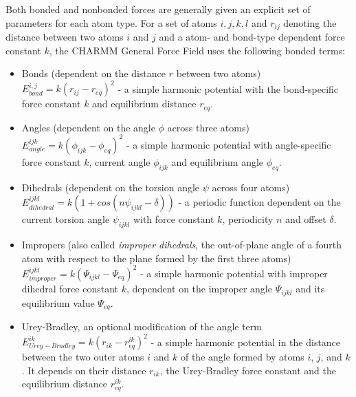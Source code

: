 \documentclass[oneside]{scrreprt}
\begin{document}
Both bonded and nonbonded forces are generally given an explicit set of parameters for each atom type. For a set of atoms $i,j,k,l$ and $r_{ij}$ denoting the distance between two atoms $i$ and $j$ and a atom- and bond-type dependent force constant $k$, the CHARMM General Force Field\cite{vanommeslaeghe_charmm_2010} uses the following bonded terms:
\begin{itemize}
    \item Bonds (dependent on the distance $r$ between two atoms)\\
    
    $E_{bond}^{i,j}=k(r_{ij}-r_{eq})^2$ - a simple harmonic potential with the bond-specific force constant $k$ and equilibrium distance $r_{eq}$.
    \item Angles (dependent on the angle $\phi$ across three atoms)\\
    
    $E_{angle}^{ijk}=k(\phi_{ijk}-\phi_{eq})^2$ - a simple harmonic potential with angle-specific force constant $k$, current angle $\phi_{ijk}$ and equilibrium angle $\phi_{eq}$.
    \item Dihedrals (dependent on the torsion angle $\psi$ across four atoms)\\
    
    $E_{dihedral}^{ijkl}=k (1+cos(n\psi_{ijkl}-\delta))$ - a periodic function dependent on the current torsion angle $\psi_{ijkl}$ with force constant $k$, periodicity $n$ and offset $\delta$.
    \item Impropers (also called \emph{improper dihedrals}, the out-of-plane angle of a fourth atom with respect to the plane formed by the first three atoms)\\
    
    $E_{improper}^{ijkl}=k(\Psi_{ijkl}-\Psi_{eq})^2$ - a simple harmonic potential with improper dihedral force constant $k$, dependent on the improper angle $\Psi_{ijkl}$ and its equilibrium value $\Psi_{eq}$.
    
    \item Urey-Bradley, an optional modification of the angle term\\
    
    $E_{Urey-Bradley}^{ik}=k(r_{ik}-r^{ik}_{eq})^2$ - a simple harmonic potential in the distance between the two outer atoms $i$ and $k$ of the angle formed by atoms $i$, $j$, and $k$. It depends on their distance $r_{ik}$, the Urey-Bradley force constant and the equilibrium distance $r^{ik}_{eq}$.
\end{itemize}
\end{document}
